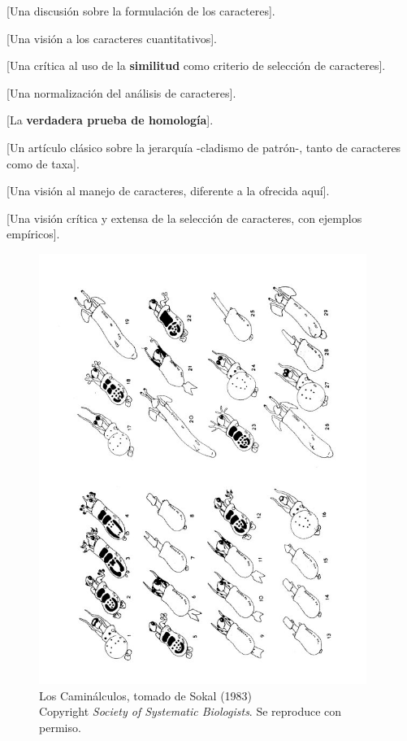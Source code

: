 \cite{dePinna1991} [Una discusi\'on sobre la formulaci\'on de los caracteres].

\cite{Goloboff2006} [Una visi\'on a los caracteres cuantitativos].

\cite{kluge2003} [Una cr\'itica al uso de la \textbf{similitud} como criterio de selecci\'on de caracteres].

\cite{Neff1986} [Una normalizaci\'on del an\'alisis de caracteres].

\cite{Patterson1981} [La \textbf{verdadera prueba de homolog\'ia}].

\cite{Platnick1979} [Un art\'iculo cl\'asico sobre la jerarqu\'ia -cladismo de patr\'on-, tanto de caracteres como de taxa].

\cite{Pleijel1995} [Una visi\'on al manejo de caracteres, diferente a la ofrecida aqu\'i].

\cite{RK2002} [Una visi\'on cr\'itica y extensa de la selecci\'on de caracteres, con ejemplos emp\'iricos].


\begin{center}
\begin{figure}
\includegraphics[width=0.95\textwidth]{./imagenes/cami0.jpg}
	\caption{Los Camin\'alculos, tomado de Sokal (1983)\\
	Copyright \textit{Society of Systematic Biologists}. Se reproduce con permiso.}
\end{figure}
\end{center}
